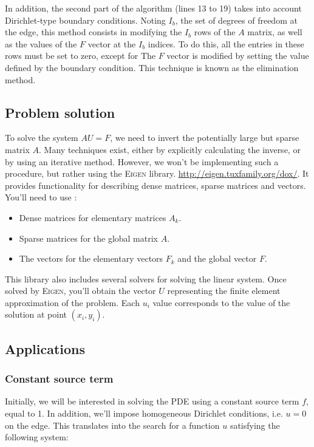 \documentclass[english,10pt,a4paper]{article}
\begin{document}
In addition, the second part of the algorithm (lines 13 to 19) takes into account Dirichlet-type boundary conditions. Noting $I_b$, the set of degrees of freedom at the edge,
this method consists in modifying the $I_b$ rows of the $A$ matrix, as well as the values of the $F$ vector at the $I_b$ indices. To do this, all the entries in these rows must be set to zero, except for
The $F$ vector is modified by setting the value defined by the boundary condition. This technique is known as the elimination method.


\subsection{Problem solution}

To solve the system $A U = F$, we need to invert the potentially large but sparse matrix $A$.
Many techniques exist, either by explicitly calculating the inverse, or by using an iterative method.
However, we won't be implementing such a procedure, but rather using the \textsc{Eigen} library. \href{http://eigen.tuxfamily.org/dox/}{\color{shellpromptcolor} http://eigen.tuxfamily.org/dox/}.
It provides functionality for describing dense matrices, sparse matrices and vectors.
You'll need to use :
\begin{itemize}
\item Dense matrices for elementary matrices $A_k$.
\item Sparse matrices for the global matrix $A$.
\item The vectors for the elementary vectors $F_k$ and the global vector $F$.
\end{itemize}

This library also includes several solvers for solving the linear system.
Once solved by \textsc{Eigen}, you'll obtain the vector $U$ representing the finite element approximation of the problem.
Each $u_i$ value corresponds to the value of the solution at point $(x_i,y_i)$.

\subsection{Applications}

\subsubsection{Constant source term}

Initially, we will be interested in solving the PDE using a constant source term $f$, equal to 1.
In addition, we'll impose homogeneous Dirichlet conditions, i.e. $u=0$ on the edge.
This translates into the search for a function $u$ satisfying the following system:
\end{document}
